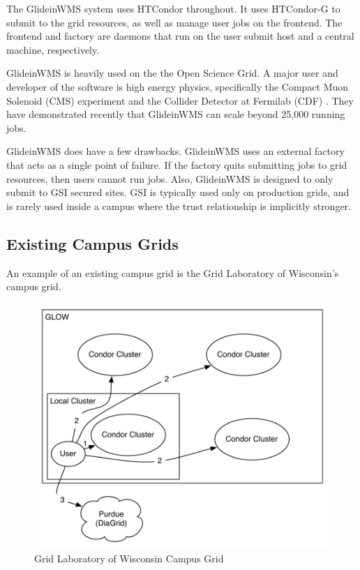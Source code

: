 The GlideinWMS system uses HTCondor throughout.  It uses HTCondor-G \cite{frey2002condor} to submit to the grid resources, as well as manage user jobs on the frontend.  The frontend and factory are daemons that run on the user submit host and a central machine, respectively.  
 
GlideinWMS is heavily used on the the Open Science Grid.  A major user and developer of the software is high energy physics, specifically the Compact Muon Solenoid (CMS) experiment \cite{bradley2010use} and the Collider Detector at Fermilab (CDF) \cite{zvada2010cdf}.  They have demonstrated recently that GlideinWMS can scale beyond 25,000 running jobs.
 
GlideinWMS does have a few drawbacks.  GlideinWMS uses an external factory that acts as a single point of failure.  If the factory quits submitting jobs to grid resources, then users cannot run jobs.  Also, GlideinWMS is designed to only submit to GSI secured sites.  GSI is typically used only on production grids, and is rarely used inside a campus where the trust relationship is implicitly stronger.  



\subsection{Existing Campus Grids}

An example of an existing campus grid is the Grid Laboratory of Wisconsin's campus grid.

\begin{figure}[h!t]
	\centering
	\includegraphics[scale=0.6]{images/GLOW-Campus}
	\caption{Grid Laboratory of Wisconsin Campus Grid}
	\label{fig:GLOWCampus}
\end{figure}



